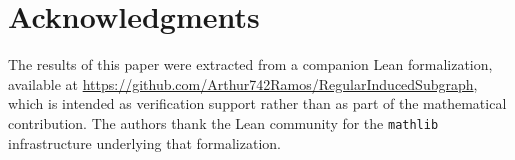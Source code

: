 \documentclass[11pt]{amsart}
\theoremstyle{definition}
\begin{document}
\section*{Acknowledgments}

{\sloppy
The results of this paper were extracted from a companion Lean formalization, available at
\url{https://github.com/Arthur742Ramos/RegularInducedSubgraph}, which is intended as
verification support rather than as part of the mathematical contribution. The authors
thank the Lean community for the \texttt{mathlib} infrastructure underlying that
formalization.\par}
\end{document}
